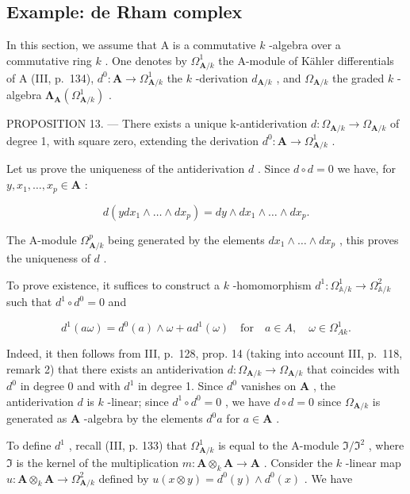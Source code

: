 \subsection{Example: de Rham complex}

In this section, we assume that A is a commutative \(k\) -algebra over a commutative ring \(k\) . One denotes by \(\Omega_{\mathbf{A}/k}^{1}\) the A-module of Kähler differentials of A (III, p.~134), \(d^{0}: \mathbf{A} \to \Omega_{\mathbf{A}/k}^{1}\) the \(k\) -derivation \(d_{\mathbf{A}/k}\) , and \(\Omega_{\mathbf{A}/k}\) the graded \(k\) -algebra \(\boldsymbol{\Lambda}_{\mathbf{A}}(\Omega_{\mathbf{A}/k}^{1})\) .

PROPOSITION 13. — There exists a unique k-antiderivation \(d: \Omega_{\mathbf{A}/k} \to \Omega_{\mathbf{A}/k}\) of degree 1, with square zero, extending the derivation \(d^{0}: \mathbf{A} \to \Omega_{\mathbf{A}/k}^{1}\) .

Let us prove the uniqueness of the antiderivation \(d\) . Since \(d \circ d = 0\) we have, for \(y, x_1, \ldots, x_p \in \mathbf{A}\) :

\[
d \left(y d x _ {1} \wedge \dots \wedge d x _ {p}\right) = d y \wedge d x _ {1} \wedge \dots \wedge d x _ {p}.
\]

The A-module \(\Omega_{\mathbf{A}/k}^{p}\) being generated by the elements \(dx_{1} \wedge \ldots \wedge dx_{p}\) , this proves the uniqueness of \(d\) .

To prove existence, it suffices to construct a \(k\) -homomorphism \(d^{1}:\Omega_{\mathbb{A}/k}^{1}\to\Omega_{\mathbb{A}/k}^{2}\) such that \(d^{1}\circ d^{0}=0\) and

\[
d ^ {1} (a \omega) = d ^ {0} (a) \wedge \omega + a d ^ {1} (\omega) \quad \text {for} \quad a \in A, \quad \omega \in \Omega_ {A k} ^ {1}.\tag{11}
\]

Indeed, it then follows from III, p.~128, prop. 14 (taking into account III, p.~118, remark 2) that there exists an antiderivation \(d: \Omega_{\mathbf{A}/k} \to \Omega_{\mathbf{A}/k}\) that coincides with \(d^{0}\) in degree 0 and with \(d^{1}\) in degree 1. Since \(d^{0}\) vanishes on \(\mathbf{A}\) , the antiderivation \(d\) is \(k\) -linear; since \(d^{1} \circ d^{0} = 0\) , we have \(d \circ d = 0\) since \(\Omega_{\mathbf{A}/k}\) is generated as \(\mathbf{A}\) -algebra by the elements \(d^{0} a\) for \(a \in \mathbf{A}\) .

To define \(d^{1}\) , recall (III, p. 133) that \(\Omega_{\mathbf{A}/k}^{1}\) is equal to the A-module \(\mathfrak{I}/\mathfrak{I}^{2}\) , where \(\mathfrak{I}\) is the kernel of the multiplication \(m: \mathbf{A} \otimes_{k} \mathbf{A} \to \mathbf{A}\) . Consider the \(k\) -linear map \(u: \mathbf{A} \otimes_{k} \mathbf{A} \to \Omega_{\mathbf{A}/k}^{2}\) defined by \(u(x \otimes y) = d^{0}(y) \wedge d^{0}(x)\) . We have

